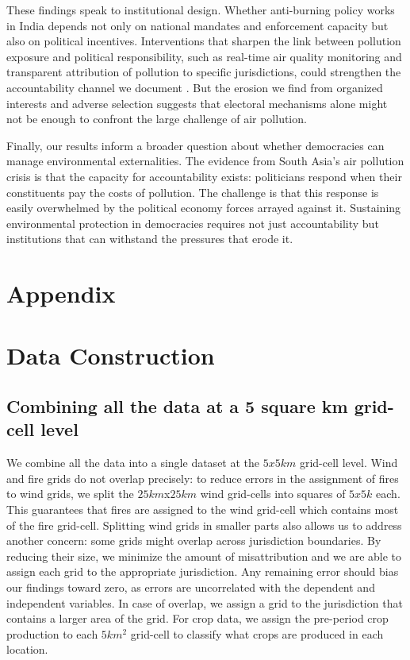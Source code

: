 \documentclass[12pt]{article}
\begin{document}
{These findings speak to institutional design. Whether anti-burning policy works in India depends not only on national mandates and enforcement capacity but also on political incentives. 
Interventions that sharpen the link between pollution exposure and political responsibility, such as real-time air quality monitoring and transparent attribution of pollution to specific jurisdictions, could strengthen the accountability channel we document \citep{singh_thachil_2023_airpollution}. But the erosion we find from organized interests and adverse selection suggests that electoral mechanisms alone might not be enough to confront the large challenge of air pollution.

Finally, our results inform a broader question about whether democracies can manage environmental externalities. The evidence from South Asia's air pollution crisis is that the capacity for accountability exists: politicians respond when their constituents pay the costs of pollution. The challenge is that this response is easily overwhelmed by the political economy forces arrayed against it. Sustaining environmental protection in democracies requires not just accountability but institutions that can withstand the pressures that erode it.


\clearpage
\FloatBarrier
\printbibliography



\clearpage
\appendix

\setcounter{page}{1}
\setcounter{figure}{0}
\setcounter{table}{0}
\onehalfspacing



\section*{Appendix}
\section{Data Construction}
\subsection{Combining all the data at a 5 square km grid-cell level}\label{ssec:data_construction}
We combine all the data into a single dataset at the $5x5km$ grid-cell level. Wind and fire grids do not overlap precisely: to reduce errors in the assignment of fires to wind grids, we split the $25km$x$25km$ wind grid-cells into squares of $5x5k$ each. This guarantees that fires are assigned to the wind grid-cell which contains most of the fire grid-cell. Splitting wind grids in smaller parts also allows us to address another concern: some grids might overlap across jurisdiction boundaries. By reducing their size, we minimize the amount of misattribution and we are able to assign each grid to the appropriate jurisdiction. Any remaining error should bias our findings toward zero, as errors are uncorrelated with the dependent and independent variables. In case of overlap, we assign a grid to the jurisdiction that contains a larger area of the grid. For crop data, we assign the pre-period crop production to each $5km^2$ grid-cell to classify what crops are produced in each location. 

}
\end{document}
